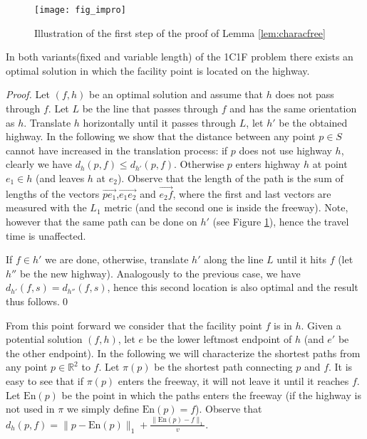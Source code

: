 \documentclass{llncs}
\def\R{\mathbb{R}}
\newcommand{\entry}{\mathrm{En}}
\begin{document}
\begin{figure}[h]
    \centering
    \texttt{[image: fig\_impro]}
    \caption{Illustration of the first step of the proof of Lemma \ref{lem:characfree}}
    \label{fig_impro}
\end{figure}
\begin{lemma}\label{lem:characfree}
In both variants(fixed and variable length) of the 1C1F problem  there exists an optimal solution in which the facility point is located on the highway.
\end{lemma}
\begin{proof}
Let $(f,h)$ be an optimal solution and assume that $h$ does not pass through $f$. Let $L$ be the line that passes through $f$ and has the same orientation as $h$. Translate $h$ horizontally until it passes through $L$, let $h'$ be the obtained highway. In the following we show that the distance between any point $p\in S$ cannot have increased in the translation process: if $p$ does not use highway $h$, clearly we have $d_h(p,f)\leq d_{h'}(p,f)$. Otherwise $p$ enters highway $h$ at point $e_1\in h$ (and leaves $h$ at $e_2$). Observe that the length of the path is the sum of lengths of the vectors $\vec{pe_1}$,$\vec{e_1e_2}$ and $\vec{e_2f}$, where the first and last  vectors are measured with the $L_1$ metric (and the second one is inside the freeway). Note, however that the same path can be done on $h'$ (see Figure \ref{fig_impro}), hence the travel time is unaffected.

If $f\in h'$ we are done, otherwise, translate $h'$ along the line $L$ until it hits $f$ (let $h''$ be the new highway). Analogously to the previous case, we have $d_{h'}(f,s)=d_{h''}(f,s)$, hence this second location is also optimal and the result thus follows.\qed
\end{proof}



From this point forward we consider that the facility point $f$ is in $h$. Given a potential solution $(f,h)$, let $e$ be the lower leftmost endpoint of $h$ (and $e'$ be the other endpoint). In the following we will characterize the shortest paths from any point $p\in\R^2$ to $f$. Let $\pi(p)$ be the shortest path connecting $p$ and $f$. It is easy to see that if $\pi(p)$ enters the freeway, it will not leave it until it reaches $f$. Let $\entry(p)$ be the point in which the paths enters the freeway (if the highway is not used in $\pi$ we simply define $\entry(p)=f$). Observe that $d_h(p,f)=\|p-\entry(p)\|_1+\frac{\|\entry(p)-f\|_1}{v}$.
\end{document}
